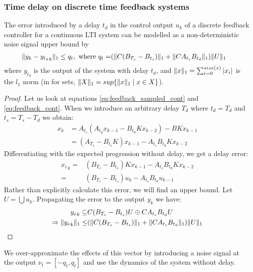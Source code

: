 \documentclass[sigconf]{llncs}
\DeclarePairedDelimiter\norm{\lVert}{\rVert}
\newcommand{\mat}[1]{{#1}}
\renewcommand{\vec}[1]{{#1}}
\begin{document}
\subsubsection{Time delay on discrete time feedback systems} \label{sec:delay}
\begin{theorem}
The error introduced by a delay $t_d$ in the control output $\vec{u}_k$ of a discrete feedback controller for a continuous LTI system can be modelled as a non-deterministic noise signal upper bound by 
\begin{align}
\norm{\vec{y}_{k}-{\vec{y}_{t_d}}_{k}}_1 \leq q_t, \text{ where } q_t=&(\norm{\mat{C}(\mat{B}_{T_s}-\mat{B}_{t_s})}_1+\norm{\mat{C}\mat{A}_{t_s}\mat{B}_{t_d}}_1)\norm{U}_1
\end{align}
where $\vec{y}_{t_d}$ is the output of the system with delay $t_d$, and $\norm{\vec{x}}_1=\sum_{i=0}^{size(\vec{x})} |\vec{x}_i|$ is the $l_1$ norm (in for sets, $\norm{X}_1 = sup \{\norm{\vec{x}}_1 \mid \vec{x} \in X\}$). 
\end{theorem}

\begin{proof}
Let us look at equations \eqref{eq:feedback_sampled_cont} and
\eqref{eq:feedback_cont}.  When we introduce an arbitrary delay $T_d$ where
$t_d=T_d$ and $t_s=T_s-T_d$ we obtain:
%
\begin{align}
\vec{x}_{k} &=\mat{A}_{t_s}(\mat{A}_{t_d}\vec{x}_{k-1}-\mat{B}_{t_d}\mat{K}\vec{x}_{k-2})-\mat{B}\mat{K}\vec{x}_{k-1}\nonumber\\
&=  (\mat{A}_{T_s}-\mat{B}_{t_s}\mat{K})\vec{x}_{k-1}-\mat{A}_{t_s}\mat{B}_{t_d}\mat{K}\vec{x}_{k-2}
\label{eq:delay_cont}
\end{align}
%
Differentiating with the expected progression without delay, we get a delay
error:
%
\begin{align}
{\vec{x}_e}_{k}=&(\mat{B}_{T_s}-\mat{B}_{t_s})\mat{K}\vec{x}_{k-1}-\mat{A}_{t_s}\mat{B}_{t_d}\mat{K}\vec{x}_{k-2}\nonumber\\
=&(\mat{B}_{T_s}-\mat{B}_{t_s})\vec{u}_{k}-\mat{A}_{t_s}\mat{B}_{t_d}\vec{u}_{k-1}
\end{align}
Rather than explicitly calculate this error, we will find an upper bound. Let $U = \bigcup \vec{u}_k$. Propagating the error to the output $\vec{y}_k$ we have:
\begin{align}
{\vec{y}_e}_{k} \subseteq &\mat{C}(\mat{B}_{T_s}-\mat{B}_{t_s})U\oplus\mat{C}\mat{A}_{t_s}\mat{B}_{t_d}U\\
\Rightarrow \norm{{\vec{y}_e}_{k}}_1 \leq & (\norm{\mat{C}(\mat{B}_{T_s}-\mat{B}_{t_s})}_1+\norm{\mat{C}\mat{A}_{t_s}\mat{B}_{t_d}}_1)\norm{U}_1
\end{align}
\end{proof}
We over-approximate the effects of this vector by introducing a noise signal at the output $\nu_t=[-q_t, q_t]$ and use the dynamics of the system without delay.
\end{document}
